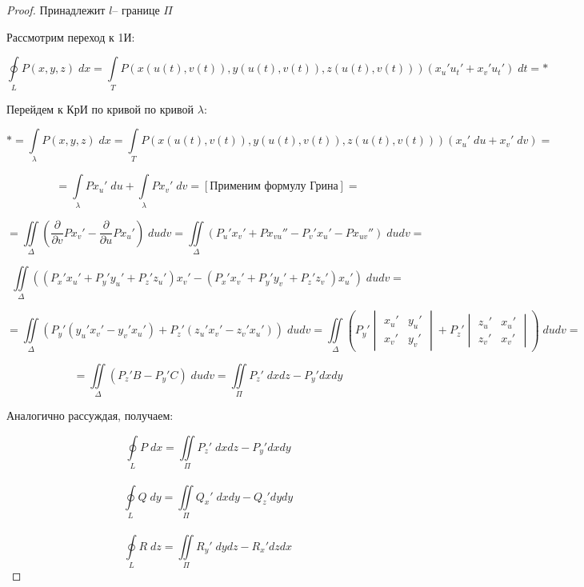\documentclass[../../main.tex]{subfiles}
\begin{document}
\begin{theorem}
\begin{proof}
			 Принадлежит $l$\--- границе $\Pi$
			 
			 Рассмотрим переход к 1И:
			 
			 \[ \oint \limits_L P\left( x,y,z \right) \; dx = \int \limits_T P \left( x\left( u\left( t\right), v\left( t\right)   \right), y\left( u\left( t\right), v\left( t\right)   \right)  ,z\left( u\left( t\right), v\left( t\right)   \right) \right) \left( x_u' u_t' + x_v' u_t' \right) \; dt = *  \]
			 
			 Перейдем к КрИ по кривой по кривой $\lambda$:
			 
			 \[ * = \int \limits_{\lambda} P\left( x,y,z \right) \; dx = \int \limits_T P \left( x\left( u\left( t\right), v\left( t\right)   \right), y\left( u\left( t\right), v\left( t\right)   \right)  ,z\left( u\left( t\right), v\left( t\right)   \right) \right) \left( x_u' \; du + x_v ' \; dv \right) =  \]
			 
			 \[ = \int \limits_{\lambda} P x_u' \; du + \int \limits_{\lambda} P x_v' \; dv =  \left[   \text{Применим формулу Грина}  \right] =   \]
			 
			 \[ = \iint \limits_{\Delta} \left( \frac{\partial}{\partial{v}} P x_v' - \frac{\partial}{\partial{u}} P x_u' \right) \; du dv = \iint \limits_{\Delta} \left(
			 P_u' x_v ' + P x_{vu} '' - P_v' x_u' - P x_{uv}'' \right) \; du dv  =  \]
			 
			 \[ \iint \limits_{\Delta} \left( \left( P_x' x_u' + P_y' y_u' + P_z ' z_u' \right) x_v' - \left( P_x' x_v' + P_y' y_v' + P_z ' z_v' \right) x_u'  \right) \; du dv =  \]
			
			\[ = \iint \limits_{\Delta} \left( P_y'\left( y_u' x_v' - y_v' x_u' \right) + P_z'\left( z_u' x_v' - z_v' x_u' \right)   \right) \; du dv = \iint \limits_{\Delta} \left( P_y' \begin{vmatrix} x_u' & y_u' \\ x_v' & y_v'  \end{vmatrix} + P_z' \begin{vmatrix} z_u' & x_u' \\ z_v' & x_v'  \end{vmatrix} \right) \; dudv =      \]
			
			\[ = \iint \limits_{\Delta}  \left( P_z' B - P_y' C  \right) \; dudv = \iint \limits_{\Pi}  P_z' \; dxdz - P_y' dxdy     \]
			
			Аналогично рассуждая, получаем:
			
			 \begin{equation} \label{P_oints_Stocks} \oint \limits_L P \; dx = \iint \limits_{\Pi}  P_z' \; dxdz - P_y' dxdy \end{equation}\\
			\begin{equation}  \label{Q_oints_Stocks} \oint \limits_L Q \; dy = \iint \limits_{\Pi}  Q_x' \; dxdy - Q_z' dydy \end{equation}\\
			\begin{equation}  \label{R_oints_Stocks} \oint \limits_L R \; dz = \iint \limits_{\Pi}  R_y' \; dydz - R_x' dzdx \end{equation}
			

\end{proof}
\end{theorem}
\end{document}
